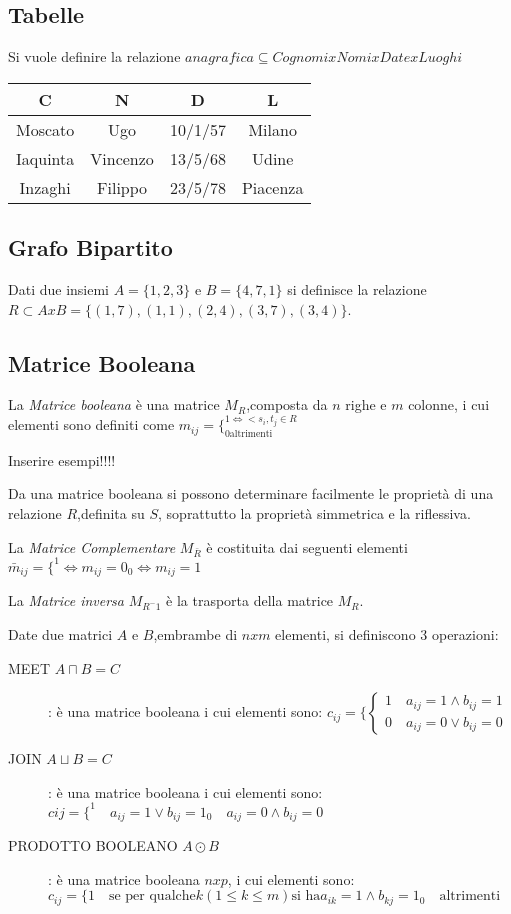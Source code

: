 \subsection{Tabelle}
Si vuole definire la relazione $anagrafica \subseteq Cognomi x Nomi x Date x Luoghi$

\begin{tabular}{cccc}
\toprule
C & N & D & L \\
\midrule
Moscato & Ugo & 10/1/57 & Milano \\
Iaquinta & Vincenzo & 13/5/68 & Udine \\
Inzaghi & Filippo & 23/5/78 & Piacenza \\
\bottomrule
\end{tabular}

\subsection{Grafo Bipartito}
Dati due insiemi $A = \{ 1,2,3 \}$ e $B = \{ 4,7,1 \}$ si definisce la relazione
$R \subset A x B = \{ (1,7),(1,1),(2,4),(3,7),(3,4) \}$.


\subsection{Matrice Booleana}
La \emph{Matrice booleana} è una matrice $M_R$,composta da $n$ righe e $m$ colonne,
i cui elementi sono definiti come $m_{ij} = \{ ^{1 \iff <s_i,t_j \in R} _{0 \text{altrimenti}}$

Inserire esempi!!!!

Da una matrice booleana si possono determinare facilmente le proprietà
di una relazione $R$,definita su $S$, soprattutto la proprietà simmetrica e la riflessiva.

La \emph{Matrice Complementare} $M_{\bar{R}}$ è costituita dai seguenti elementi
$\bar{m}_{ij} = \{ ^ 1 \iff m_{ij} = 0 _ 0 \iff m_{ij} = 1$

La \emph{Matrice inversa} $M_{R ^-1}$ è la trasporta della matrice $M_R$.

Date due matrici $A$ e $B$,embrambe di $n x m$ elementi, si definiscono 3 operazioni:
\begin{description}
    \item[MEET $A \sqcap B = C$]: è una matrice booleana i cui elementi sono:
$c_{ij} = \{ \begin{cases} 1 \quad a_{ij} = 1 \land b_{ij} = 1 \\ 0 \quad a_{ij} = 0 \lor b_{ij} = 0 \end{cases}$
    \item[JOIN $A \sqcup B = C$]: è una matrice booleana i cui elementi sono:
    $c{ij} = \{ ^ 1 \quad a_{ij} = 1 \lor b_{ij} = 1 _ 0 \quad a_{ij} = 0 \land b_{ij} = 0$
    \item[PRODOTTO BOOLEANO $A \odot B$]: è una matrice booleana $n x p$, i cui elementi sono:
    $c_{ij} = \{1 \quad \text{se per qualche} k(1 \leq k \leq m) \text{si ha} a_{ik} = 1 \land b_{kj} = 1
    _ 0 \quad \text{altrimenti}$
\end{description}

